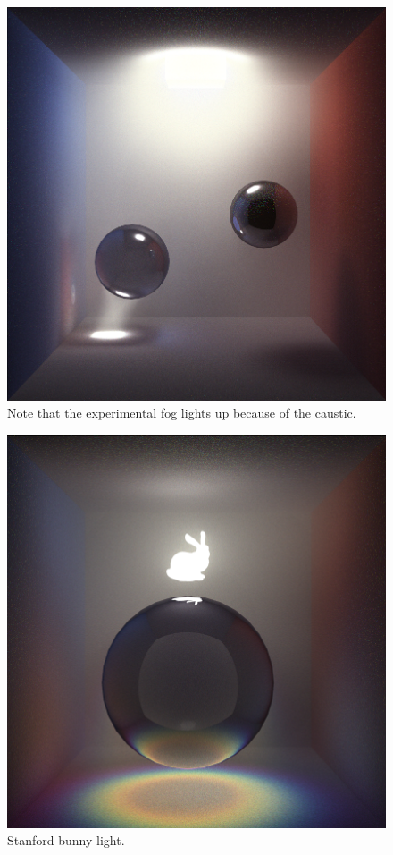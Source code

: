 \documentclass[12pt]{article}
\begin{document}
\begin{figure} 
\centering
  \includegraphics[width = 6 in]{fig9.png}
  \caption{ Note that the experimental fog lights up because of the caustic.
}
\end{figure}


\begin{figure} 
\centering
  \includegraphics[width = 6 in]{fig10.png}
  \caption{ Stanford bunny light.
}
\end{figure}
\end{document}

